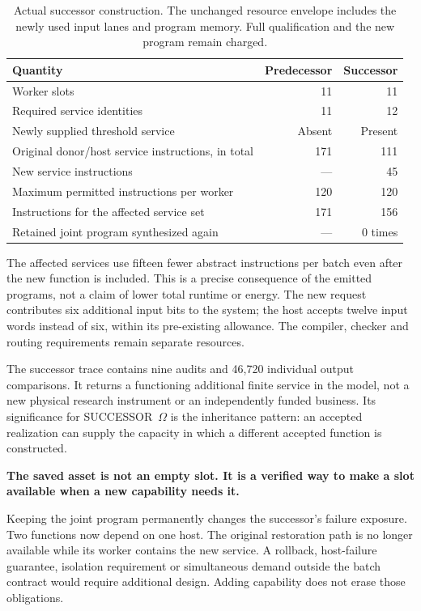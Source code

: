 \documentclass[11pt,letterpaper]{article}
\theoremstyle{definition}\newtheorem{definition}[theorem]{Definition}
\theoremstyle{remark}\newtheorem{remark}[theorem]{Remark}
\newcommand{\Om}{\texorpdfstring{SUCCESSOR~$\Omega$}{SUCCESSOR Omega}}
\begin{document}
\begin{table}[htbp]\centering\small
\caption{Actual successor construction. The unchanged resource envelope includes the newly used input lanes and program memory. Full qualification and the new program remain charged.}
\begin{tabularx}{\linewidth}{@{}Yrr@{}}\toprule
Quantity & Predecessor & Successor\\\midrule
Worker slots & 11 & 11\\
Required service identities & 11 & 12\\
Newly supplied threshold service & Absent & Present\\
Original donor/host service instructions, in total & 171 & 111\\
New service instructions & --- & 45\\
Maximum permitted instructions per worker & 120 & 120\\
Instructions for the affected service set & 171 & 156\\
Retained joint program synthesized again & --- & 0 times\\\bottomrule
\end{tabularx}
\label{tab:successor}
\end{table}

The affected services use fifteen fewer abstract instructions per batch even after the new function is included. This is a precise consequence of the emitted programs, not a claim of lower total runtime or energy. The new request contributes six additional input bits to the system; the host accepts twelve input words instead of six, within its pre-existing allowance. The compiler, checker and routing requirements remain separate resources.

The successor trace contains nine audits and 46,720 individual output comparisons. It returns a functioning additional finite service in the model, not a new physical research instrument or an independently funded business. Its significance for \Om{} is the inheritance pattern: an accepted realization can supply the capacity in which a different accepted function is constructed.

\begin{thesis}
\textbf{The saved asset is not an empty slot. It is a verified way to make a slot available when a new capability needs it.}
\end{thesis}

Keeping the joint program permanently changes the successor's failure exposure. Two functions now depend on one host. The original restoration path is no longer available while its worker contains the new service. A rollback, host-failure guarantee, isolation requirement or simultaneous demand outside the batch contract would require additional design. Adding capability does not erase those obligations.
\end{document}
